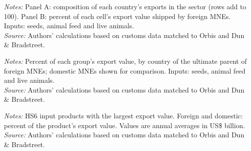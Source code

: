 \documentclass[11pt,a4paper]{article}
\begin{document}
\begin{table}[H]\centering\footnotesize%
  \caption{Agriculture: Exports by Exporting Country and Inputs and Other Products}%
  \label{tab:sc_inputs_ht_agro}%
  \par\vspace{3pt}%
  \begin{minipage}{0.95\textwidth}\footnotesize %
  \textit{Notes:} Panel A: composition of each country's exports in the sector (rows add to 100). Panel B: percent of each cell's export value shipped by foreign MNEs. Inputs: seeds, animal feed and live animals.\\[3pt]%
  \textit{Source:} Authors' calculations based on customs data matched to Orbis and Dun \& Bradstreet.%
  \end{minipage}%
  \end{table}
\begin{table}[H]\centering\footnotesize%
  \caption{Agriculture: Exports by Inputs and Other Products and Parent Country}%
  \label{tab:sc_inputs_par_agro}%
  \par\vspace{3pt}%
  \begin{minipage}{0.95\textwidth}\footnotesize %
  \textit{Notes:} Percent of each group's export value, by country of the ultimate parent of foreign MNEs; domestic MNEs shown for comparison. Inputs: seeds, animal feed and live animals.\\[3pt]%
  \textit{Source:} Authors' calculations based on customs data matched to Orbis and Dun \& Bradstreet.%
  \end{minipage}%
  \end{table}
\begin{table}[H]\centering\footnotesize%
  \caption{Agriculture: Largest Input Products}%
  \label{tab:sc_topin_agro}%
  \par\vspace{3pt}%
  \begin{minipage}{0.95\textwidth}\footnotesize %
  \textit{Notes:} HS6 input products with the largest export value. Foreign and domestic: percent of the product's export value. Values are annual averages in US\$ billion.\\[3pt]%
  \textit{Source:} Authors' calculations based on customs data matched to Orbis and Dun \& Bradstreet.%
  \end{minipage}%
  \end{table}
\end{document}
